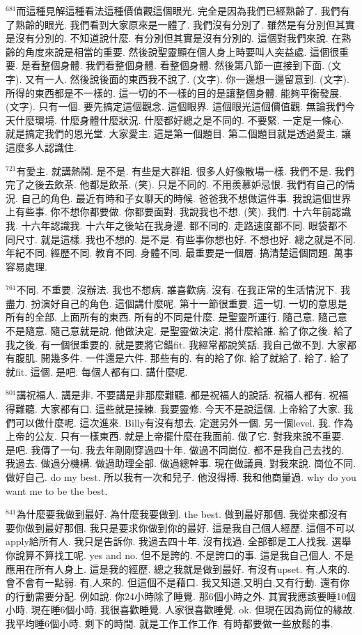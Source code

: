 \documentclass{book}
\begin{document}
$^{681}$而這種見解這種看法這種價值觀這個眼光.
完全是因為我們已經熟齡了.
我們有了熟齡的眼光.
我們看到大家原來是一體了.
我們沒有分別了.
雖然是有分別但其實是沒有分別的.
不知道說什麼.
有分別但其實是沒有分別的.
這個對我們來說.
在熟齡的角度來說是相當的重要.
然後說聖靈顯在個人身上時要叫人突益處.
這個很重要.
是看整個身體.
我們看整個身體.
看整個身體.
然後第八節一直接到下面.
(文字).
又有一人.
然後說後面的東西我不說了.
(文字).
你一邊想一邊留意到.
(文字).
所得的東西都是不一樣的.
這一切的不一樣的目的是讓整個身體.
能夠平衡發展.
(文字).
只有一個.
要先搞定這個觀念.
這個眼界.
這個眼光這個價值觀.
無論我們今天什麼環境.
什麼身體什麼狀況.
什麼都好總之是不同的.
不要緊.
一定是一條心.
就是搞定我們的恩光堂.
大家愛主.
這是第一個題目.
第二個題目就是透過愛主.
讓這麼多人認識住.

$^{721}$有愛主.
就講熱鬧.
是不是.
有些是大群組.
很多人好像散場一樣.
我們不是.
我們完了之後去飲茶.
他都是飲茶.
(笑).
只是不同的.
不用羨慕妒忌恨.
我們有自己的情況.
自己的角色.
最近有時和子女聊天的時候.
爸爸我不想做這件事.
我說這個世界上有些事.
你不想你都要做.
你都要面對.
我說我也不想.
(笑).
我們.
十六年前認識我.
十六年認識我.
十六年之後站在我身邊.
都不同的.
走路速度都不同.
眼袋都不同尺寸.
就是這樣.
我也不想的.
是不是.
有些事你想也好.
不想也好.
總之就是不同.
年紀不同.
經歷不同.
教育不同.
身體不同.
最重要是一個層.
搞清楚這個問題.
萬事容易處理.

$^{761}$不同.
不重要.
沒辦法.
我也不想病.
誰喜歡病.
沒有.
在我正常的生活情況下.
我盡力.
扮演好自己的角色.
這個講什麼呢.
第十一節很重要.
這一切.
一切的意思是所有的全部.
上面所有的東西.
所有的不同是什麼.
是聖靈所運行.
隨己意.
隨己意不是隨意.
隨己意就是說.
他做決定.
是聖靈做決定.
將什麼給誰.
給了你之後.
給了我之後.
有一個很重要的.
就是要將它錯fit.
我經常都說笑話.
我自己做不到.
大家都有腹肌.
開幾多件.
一件還是六件.
那些有的.
有的給了你.
給了就給了.
給了.
給了就fit.
這個.
是吧.
每個人都有口.
講什麼呢.

$^{801}$講祝福人.
講是非.
不要講是非那麼難聽.
都是祝福人的說話.
祝福人都有.
祝福得難聽.
大家都有口.
這些就是操練.
我要靈修.
今天不是說這個.
上帝給了大家.
我們可以做什麼呢.
這次進來.
Billy有沒有想去.
定選另外一個.
另一個level.
我.
作為上帝的公友.
只有一樣東西.
就是上帝擺什麼在我面前.
做了它.
對我來說不重要.
是吧.
我傳了一句.
我去年剛剛穿過四十年.
做過不同崗位.
都不是我自己去找的.
我過去.
做過分機構.
做過助理全部.
做過總幹事.
現在做議員.
對我來說.
崗位不同.
做好自己.
do my best.
所以我有一次和兒子.
他沒得搏.
我和他商量過.
why do you want me to be the best.

$^{841}$為什麼要我做到最好.
為什麼我要做到.
the best.
做到最好那個.
我從來都沒有要你做到最好那個.
我只是要求你做到你的最好.
這是我自己個人經歷.
這個不可以apply給所有人.
我只是告訴你.
我過去四十年.
沒有找過.
全部都是工人找我.
選舉你說算不算找工呢.
yes and no.
但不是誇的.
不是誇口的事.
這是我自己個人.
不是應用在所有人身上.
這是我的經歷.
總之我就是做到最好.
有沒有upset.
有,人來的.
會不會有一點弱.
有,人來的.
但這個不是藉口.
我又知道,又明白,又有行動.
還有你的行動需要分配.
例如說.
你24小時除了睡覺.
那6個小時之外.
其實我應該要睡10個小時.
現在睡6個小時.
我很喜歡睡覺.
人家很喜歡睡覺.
ok.
但現在因為崗位的緣故.
我平均睡6個小時.
剩下的時間.
就是工作工作工作.
有時都要做一些放鬆的事.
\end{document}
